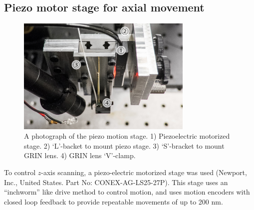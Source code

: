 \subsection{Piezo motor stage for axial movement}



\begin{figure}[h!]
\centering
\includegraphics[width=0.75\textwidth]{Images/Photographs/DSCF1714_an.jpg}
\caption[Photograph of the piezo motion stage.]{A photograph of the piezo motion stage. 1) Piezoelectric motorized stage. 2) `L'-backet to mount piezo stage. 3) `S'-bracket to mount GRIN lens. 4) GRIN lens `V'-clamp.}
\end{figure}

To control $z$-axis scanning, a piezo-electric motorized stage was used (Newport, Inc., United States. Part No: CONEX-AG-LS25-27P). This stage uses an ``inchworm'' like drive method to control motion, and uses motion encoders with closed loop feedback to provide repeatable movements of up to 200 nm.

